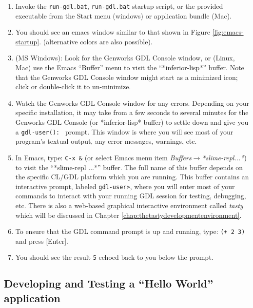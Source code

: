 \documentclass [11pt]{book}
\begin{document}
\begin{enumerate}

\item Invoke the \texttt{run-gdl.bat}, \texttt{run-gdl.bat}
startup script, or the provided executable from the Start
menu (windows) or application bundle (Mac).

\item You should see an emacs window similar to that shown in Figure 
\ref{fig:emacs-startup}. (alternative colors are also possible).

\item (MS Windows): Look for the Genworks GDL Console
window, or (Linux, Mac) use the Emacs ``Buffer'' menu to visit the
``*inferior-lisp*'' buffer. Note that the Genworks GDL Console
window might start as a minimized icon; click or double-click it to
un-minimize.

\item Watch the Genworks GDL Console window for any
errors. Depending on your specific installation, it may take from a
few seconds to several minutes for the Genworks GDL Console (or
*inferior-lisp* buffer) to settle down and give you a \texttt{gdl-user(): } prompt. This window is where you will see most of your program's textual output, any 
error messages, warnings, etc.

\item In Emacs, type: \texttt{C-x \&} (or select Emacs menu item \emph{Buffers$\rightarrow$*slime-repl...*}) to visit the ``*slime-repl ...*'' buffer. The full name
of this buffer depends on the specific CL/GDL platform which you are
running. This buffer contains an interactive prompt, labeled \texttt{gdl-user>}, where you will enter most of your commands to interact with your running GDL session
for testing, debugging, etc. There is also a web-based graphical interactive environment called \emph{tasty} which will be discussed in Chapter 
\ref{chap:thetastydevelopmentenvironment}.

\item To ensure that the GDL command prompt is up and running, type: \texttt{(+ 2 3)} and press [Enter].

\item You should see the result \texttt{5} echoed back to you below the prompt.

\end{enumerate}



\subsection{Developing and Testing a  ``Hello World'' application}
\end{document}
